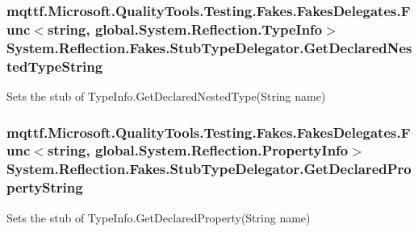 \hypertarget{class_system_1_1_reflection_1_1_fakes_1_1_stub_type_delegator_af8500d0fbc82aef76f7c0cef0006d1c4}{
\subsubsection[{Get\-Declared\-Nested\-Type\-String}]{\setlength{\rightskip}{0pt plus 5cm}mqttf.\-Microsoft.\-Quality\-Tools.\-Testing.\-Fakes.\-Fakes\-Delegates.\-Func$<$string, global.\-System.\-Reflection.\-Type\-Info$>$ System.\-Reflection.\-Fakes.\-Stub\-Type\-Delegator.\-Get\-Declared\-Nested\-Type\-String}}\label{class_system_1_1_reflection_1_1_fakes_1_1_stub_type_delegator_af8500d0fbc82aef76f7c0cef0006d1c4}


Sets the stub of Type\-Info.\-Get\-Declared\-Nested\-Type(\-String name)

\hypertarget{class_system_1_1_reflection_1_1_fakes_1_1_stub_type_delegator_a76ace4e1af87c608bb1810297cf21732}{
\subsubsection[{Get\-Declared\-Property\-String}]{\setlength{\rightskip}{0pt plus 5cm}mqttf.\-Microsoft.\-Quality\-Tools.\-Testing.\-Fakes.\-Fakes\-Delegates.\-Func$<$string, global.\-System.\-Reflection.\-Property\-Info$>$ System.\-Reflection.\-Fakes.\-Stub\-Type\-Delegator.\-Get\-Declared\-Property\-String}}\label{class_system_1_1_reflection_1_1_fakes_1_1_stub_type_delegator_a76ace4e1af87c608bb1810297cf21732}


Sets the stub of Type\-Info.\-Get\-Declared\-Property(\-String name)

